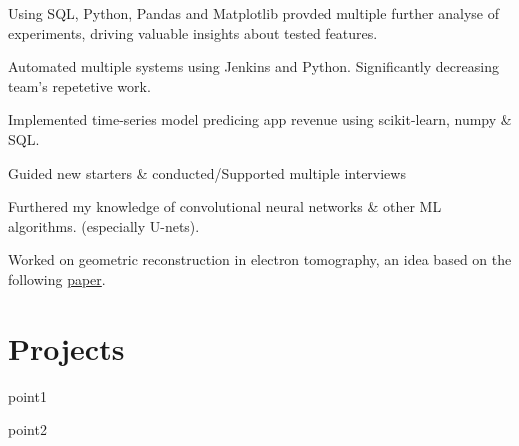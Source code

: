 \documentclass[]{CV}
\begin{document}
\begin{minipage}[t]{0.70\textwidth}
\begin{tightemize}
\item Using SQL, Python, Pandas and Matplotlib provded multiple further analyse of experiments, driving valuable insights about tested features.

\item Automated multiple systems using Jenkins and Python. Significantly decreasing team's repetetive work.

\item Implemented time-series model predicing app revenue using scikit-learn, numpy \& SQL.

\item Guided new starters \& conducted/Supported multiple interviews

\end{tightemize}
\sectionsep

\vspace{\topsep} %
\begin{tightemize}
\sectionsep
\item Furthered my knowledge of convolutional neural networks \& other ML algorithms. (especially U-nets).

\item  Worked on geometric reconstruction in electron tomography, an idea based on the following {\href{https://core.ac.uk/download/pdf/204935374.pdf}{paper}}.

\end{tightemize}
\sectionsep



\section{Projects}

\begin{tightemize}

\item point1

\item point2

\end{tightemize}
\sectionsep


\end{minipage}
\end{document}
